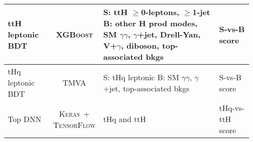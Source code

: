 \begin{tabular}{l|c|m{6cm}<{\centering}|m{4.5cm}<{\centering}}
    ttH leptonic BDT &  \textsc{XGBoost} & \makecell*[{{m{6cm}}}]{\centering S: ttH $\geq$0-leptons, $\geq$1-jet \\ B: other H prod modes, SM $\gamma\gamma$, $\gamma$+jet, Drell-Yan, V+$\gamma$, diboson, top-associated bkgs} & S-vs-B score \\ \hline
    
    tHq leptonic BDT &  \textsc{TMVA} & \makecell*[{{m{6cm}}}]{\centering S: tHq leptonic \\ B: SM $\gamma\gamma$, $\gamma$+jet, top-associated bkgs} & S-vs-B score \\ \hline
    
    Top DNN &  \makecell{\textsc{Keras}~+\\\textsc{TensorFlow}} & tHq and ttH & tHq-vs-ttH score \\
    \hline
\end{tabular}